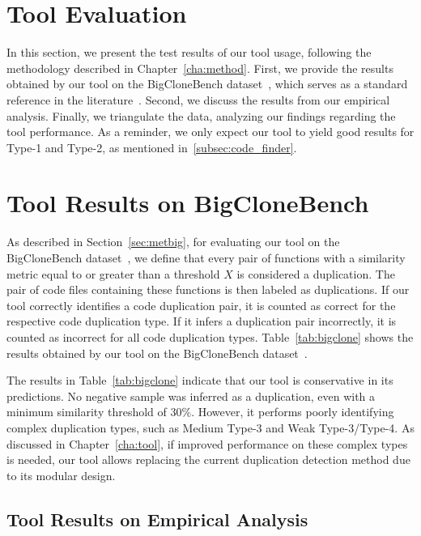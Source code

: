 \section{Tool Evaluation}
\label{sec:eval}

In this section, we present the test results of our tool usage, following the 
methodology described in Chapter~\ref{cha:method}. First, we provide the results 
obtained by our tool on the BigCloneBench dataset~\citep{bigclonebench}, which 
serves as a standard reference in the literature~\citep{litreview}. Second, we 
discuss the results from our empirical analysis. Finally, we triangulate the data, 
analyzing our findings regarding the tool performance. 
As a reminder, we only expect our tool to yield good results for Type-1 and Type-2,
as mentioned in~\ref{subsec:code_finder}.

\section{Tool Results on BigCloneBench}



As described in Section~\ref{sec:metbig}, for evaluating our tool on the BigCloneBench dataset~\citep{bigclonebench}, we define 
that every pair of functions with a similarity metric equal to or greater than a threshold \( X \) is considered a duplication. 
The pair of code files containing these functions is then labeled as duplications. If our tool correctly 
identifies a code duplication pair, it is counted as correct for the respective code duplication type. If it infers a 
duplication pair incorrectly, it is counted as incorrect for all code duplication types. Table~\ref{tab:bigclone} shows the results obtained by our tool on the BigCloneBench dataset~\citep{bigclonebench}.

The results in Table~\ref{tab:bigclone} indicate that our tool is conservative in its predictions. No negative sample was inferred as a duplication, even with a minimum similarity threshold of 30\%. However, it performs poorly identifying complex duplication types, such as Medium Type-3 and Weak Type-3/Type-4. As discussed in Chapter~\ref{cha:tool}, if improved performance on these complex types is needed, our tool allows replacing the current duplication detection method due to its modular design.

\subsection{Tool Results on Empirical Analysis}

